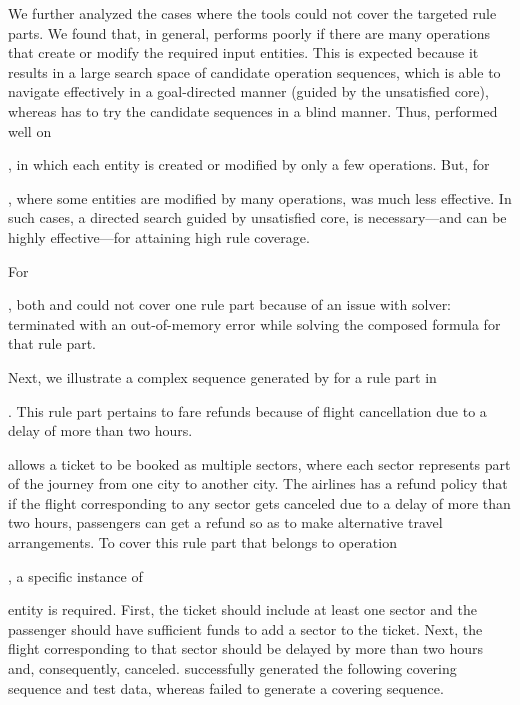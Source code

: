 We further analyzed the cases where the tools could not cover the targeted rule
parts. We found that, in general, \exhaust{} performs poorly if there are many
operations that create or modify the required input entities. This is expected
because it results in a large search space of candidate operation sequences,
which \tool{} is able to navigate effectively in a goal-directed manner (guided
by the unsatisfied core), whereas \exhaust{} has to try the candidate sequences
in a blind manner. Thus, \exhaust{} performed well on \subject{jBilling}, in
which each entity is created or modified by only a few operations. But, for
\subject{Cebu-pacific}, where some entities are modified by many operations,
\exhaust{} was much less effective. In such cases, a directed search guided by
unsatisfied core, is necessary---and can be highly effective---for attaining
high rule coverage.

For \subject{jBilling}, both \tool{} and \exhaust{} could not cover one rule
part because of an issue with \choco{} solver: \choco{} terminated with an
out-of-memory error while solving the composed formula for that rule part.


Next, we illustrate a complex sequence generated by \tool{} for a rule part in
\subject{Cebu-pacific}. This rule part pertains to fare refunds because of
flight cancellation due to a delay of more than two
hours. \subject{Cebu-pacific} allows a ticket to be booked as multiple sectors,
where each sector represents part of the journey from one city to another
city. The airlines has a refund policy that if the flight corresponding to any
sector gets canceled due to a delay of more than two hours, passengers can get a
refund so as to make alternative travel arrangements. To cover this rule part
that belongs to operation \subject{Refund}, a specific instance of
\subject{Ticket} entity is required. First, the ticket should include at least
one sector and the passenger should have sufficient funds to add a sector to the
ticket. Next, the flight corresponding to that sector should be delayed by more
than two hours and, consequently, canceled. \tool{} successfully generated the
following covering sequence and test data, whereas \exhaust{} failed to generate
a covering sequence.

